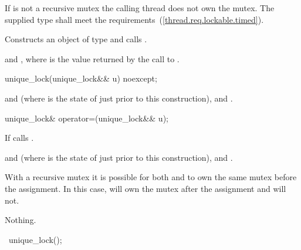 \begin{itemdescr}
\pnum
\precondition If  is not a recursive mutex the calling thread does not own the mutex.
The supplied  type shall meet the  requirements~(\ref{thread.req.lockable.timed}).

\pnum
\effects Constructs an object of type  and calls .

\pnum
\postconditions {} and , where  is the value returned by the call to .
\end{itemdescr}

%
\begin{itemdecl}
unique_lock(unique_lock&& u) noexcept;
\end{itemdecl}

\begin{itemdescr}
\pnum\postconditions {} and  (where  is the state of  just prior to this construction),   and .
\end{itemdescr}

%
%
\begin{itemdecl}
unique_lock& operator=(unique_lock&& u);
\end{itemdecl}

\begin{itemdescr}
\pnum\effects If  calls .

\pnum\postconditions {} and  (where  is the state of  just prior to this construction),   and .

\pnum
\enternote With a recursive mutex it is possible for both  and  to own the same mutex before the assignment. In this case,  will own the mutex after the assignment and  will not. \exitnote

\pnum\throws Nothing.
\end{itemdescr}


%
\begin{itemdecl}
~unique_lock();
\end{itemdecl}

